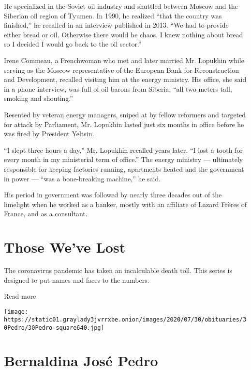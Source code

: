He specialized in the Soviet oil industry and shuttled between Moscow
and the Siberian oil region of Tyumen. In 1990, he realized ``that the
country was finished,'' he recalled in an interview published in 2013.
``We had to provide either bread or oil. Otherwise there would be chaos.
I knew nothing about bread so I decided I would go back to the oil
sector.''

Irene Commeau, a Frenchwoman who met and later married Mr. Lopukhin
while serving as the Moscow representative of the European Bank for
Reconstruction and Development, recalled visiting him at the energy
ministry. His office, she said in a phone interview, was full of oil
barons from Siberia, ``all two meters tall, smoking and shouting.''

Resented by veteran energy managers, sniped at by fellow reformers and
targeted for attack by Parliament, Mr. Lopukhin lasted just six months
in office before he was fired by President Yeltsin.

``I slept three hours a day,'' Mr. Lopukhin recalled years later. ``I
lost a tooth for every month in my ministerial term of office.'' The
energy ministry --- ultimately responsible for keeping factories
running, apartments heated and the government in power --- ``was a
bone-breaking machine,'' he said.

His period in government was followed by nearly three decades out of the
limelight when he worked as a banker, mostly with an affiliate of Lazard
Frères of France, and as a consultant.

\href{https://www.nytimes3xbfgragh.onion/interactive/2020/obituaries/people-died-coronavirus-obituaries.html?action=click\&pgtype=Article\&state=default\&region=BELOW_MAIN_CONTENT\&context=covid_obits_promo}{}

\hypertarget{those-weve-lost}{%
\section{Those We've Lost}\label{those-weve-lost}}

The coronavirus pandemic has taken an incalculable death toll. This
series is designed to put names and faces to the numbers.

Read more

\texttt{[image: https://static01.graylady3jvrrxbe.onion/images/2020/07/30/obituaries/30Pedro/30Pedro-square640.jpg]}

\hypertarget{bernaldina-josuxe9-pedro}{%
\section{Bernaldina José Pedro}\label{bernaldina-josuxe9-pedro}}

